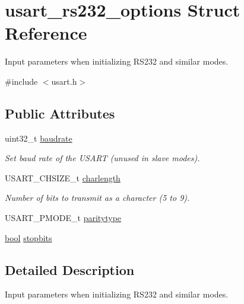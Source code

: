 \hypertarget{structusart__rs232__options}{\section{usart\-\_\-rs232\-\_\-options Struct Reference}
\label{structusart__rs232__options}
}


Input parameters when initializing R\-S232 and similar modes.  




{\ttfamily \#include $<$usart.\-h$>$}

\subsection*{Public Attributes}
\begin{DoxyCompactItemize}
\item 
\hypertarget{structusart__rs232__options_a2c48c35d680d4805d357677d7d352fd0}{uint32\-\_\-t \hyperlink{structusart__rs232__options_a2c48c35d680d4805d357677d7d352fd0}{baudrate}}\label{structusart__rs232__options_a2c48c35d680d4805d357677d7d352fd0}

\begin{DoxyCompactList}\small\item\em Set baud rate of the U\-S\-A\-R\-T (unused in slave modes). \end{DoxyCompactList}\item 
\hypertarget{structusart__rs232__options_a796ab00173dc89298c55e20c8c9c2271}{U\-S\-A\-R\-T\-\_\-\-C\-H\-S\-I\-Z\-E\-\_\-t \hyperlink{structusart__rs232__options_a796ab00173dc89298c55e20c8c9c2271}{charlength}}\label{structusart__rs232__options_a796ab00173dc89298c55e20c8c9c2271}

\begin{DoxyCompactList}\small\item\em Number of bits to transmit as a character (5 to 9). \end{DoxyCompactList}\item 
U\-S\-A\-R\-T\-\_\-\-P\-M\-O\-D\-E\-\_\-t \hyperlink{structusart__rs232__options_ad9872b97ddc8f3dee1b7a06d9bcd5898}{paritytype}
\item 
\hyperlink{group__group__xmega__utils_ga97a80ca1602ebf2303258971a2c938e2}{bool} \hyperlink{structusart__rs232__options_a3a0fe9aca38d09ec813931463f03394d}{stopbits}
\end{DoxyCompactItemize}


\subsection{Detailed Description}
Input parameters when initializing R\-S232 and similar modes. 

